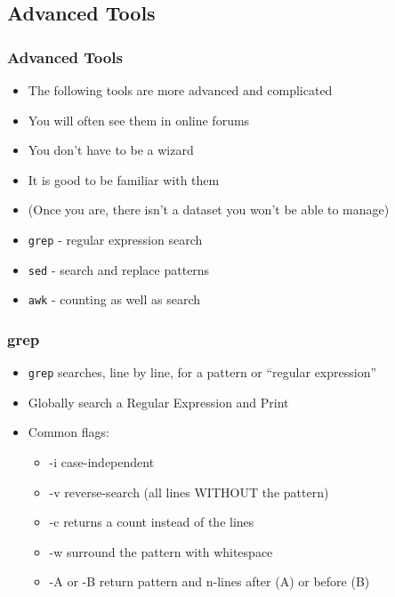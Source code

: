 \documentclass[14pt]{beamer}
\begin{document}
\subsection{Advanced Tools}

\begin{frame}
\frametitle{Advanced Tools}
\begin{itemize}
	\item The following tools are more advanced and complicated
	\item You will often see them in online forums
	\item You don't have to be a wizard
	\item It is good to be familiar with them
	\scriptsize
	\item[] (Once you are, there isn't a dataset you won't be able to manage)
	\normalsize
	\item \texttt{grep} - regular expression search
	\item \texttt{sed} - search and replace patterns
	\item \texttt{awk} - counting as well as search
\end{itemize}
\end{frame}

\begin{frame}
\frametitle{grep}
\begin{itemize}
	\item \texttt{grep} searches, line by line, for a pattern or ``regular expression''
	\item Globally search a Regular Expression and Print
	\ttfamily
	\sffamily
	\normalsize
	\item Common flags:
	\begin{itemize}
		\item -i case-independent
		\item -v reverse-search (all lines WITHOUT the pattern)
		\item -c returns a count instead of the lines
		\item -w surround the pattern with whitespace
		\item -A or -B return pattern and n-lines after (A) or before (B) 
	\end{itemize}
\end{itemize}
\end{frame}
\end{document}
